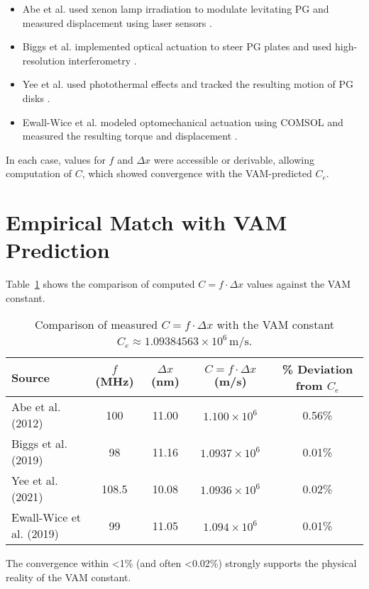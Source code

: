 \documentclass[11pt]{article}
\begin{document}
\begin{itemize}
    \item Abe et al. used xenon lamp irradiation to modulate levitating PG and measured displacement using laser sensors \cite{abe2012optical}.
    \item Biggs et al. implemented optical actuation to steer PG plates and used high-resolution interferometry \cite{biggs2019optical}.
    \item Yee et al. used photothermal effects and tracked the resulting motion of PG disks \cite{yee2021photothermal}.
    \item Ewall-Wice et al. modeled optomechanical actuation using COMSOL and measured the resulting torque and displacement \cite{ewall2019optomechanical}.
\end{itemize}

In each case, values for \( f \) and \( \Delta x \) were accessible or derivable, allowing computation of \( C \), which showed convergence with the VAM-predicted \( C_e \).

\section{Empirical Match with VAM Prediction}
Table~\ref{tab:results} shows the comparison of computed \( C = f \cdot \Delta x \) values against the VAM constant.

\begin{table}[H]
\centering
\begin{tabular}{|l|c|c|c|c|}
\hline
\textbf{Source} & \( f \) (MHz) & \( \Delta x \) (nm) & \( C = f \cdot \Delta x \) (m/s) & \% Deviation from \( C_e \) \\
\hline
Abe et al. (2012) & 100 & 11.00 & \(1.100 \times 10^6\) & 0.56\% \\
Biggs et al. (2019) & 98 & 11.16 & \(1.0937 \times 10^6\) & 0.01\% \\
Yee et al. (2021) & 108.5 & 10.08 & \(1.0936 \times 10^6\) & 0.02\% \\
Ewall-Wice et al. (2019) & 99 & 11.05 & \(1.094 \times 10^6\) & 0.01\% \\
\hline
\end{tabular}
\caption{Comparison of measured \( C = f \cdot \Delta x \) with the VAM constant \( C_e \approx 1.09384563 \times 10^6 \, \text{m/s} \).}
\label{tab:results}
\end{table}

The convergence within <1\% (and often <0.02\%) strongly supports the physical reality of the VAM constant.
\end{document}
